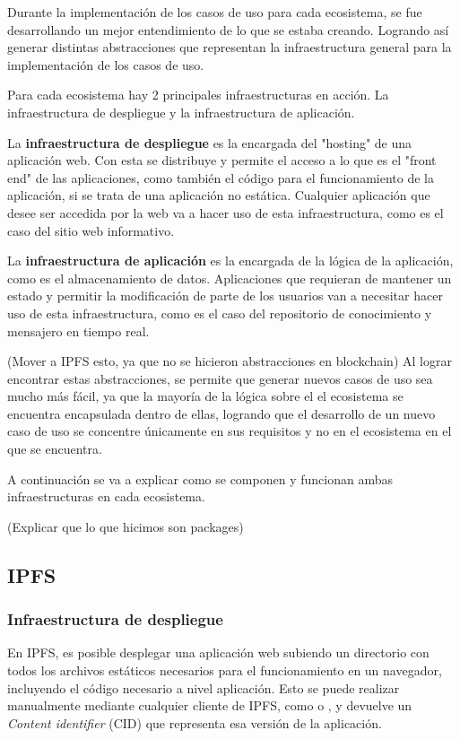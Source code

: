 Durante la implementación de los casos de uso para cada ecosistema, se fue desarrollando un mejor entendimiento de lo que se estaba creando. Logrando así generar distintas abstracciones que representan la infraestructura general para la implementación de los casos de uso.

Para cada ecosistema hay 2 principales infraestructuras en acción. La infraestructura de despliegue y la infraestructura de aplicación.

La \textbf{infraestructura de despliegue} es la encargada del "hosting" de una aplicación web. Con esta se distribuye y permite el acceso a lo que es el "front end" de las aplicaciones, como también el código para el funcionamiento de la aplicación, si se trata de una aplicación no estática. Cualquier aplicación que desee ser accedida por la web va a hacer uso de esta infraestructura, como es el caso del sitio web informativo.

La \textbf{infraestructura de aplicación} es la encargada de la lógica de la aplicación, como es el almacenamiento de datos. Aplicaciones que requieran de mantener un estado y permitir la modificación de parte de los usuarios van a necesitar hacer uso de esta infraestructura, como es el caso del repositorio de conocimiento y mensajero en tiempo real.

(Mover a IPFS esto, ya que no se hicieron abstracciones en blockchain) Al lograr encontrar estas abstracciones, se permite que generar nuevos casos de uso sea mucho más fácil, ya que la mayoría de la lógica sobre el el ecosistema se encuentra encapsulada dentro de ellas, logrando que el desarrollo de un nuevo caso de uso se concentre únicamente en sus requisitos y no en el ecosistema en el que se encuentra.

A continuación se va a explicar como se componen y funcionan ambas infraestructuras en cada ecosistema.

(Explicar que lo que hicimos son packages)

\subsection{IPFS}

\subsubsection{Infraestructura de despliegue}

En IPFS, es posible desplegar una aplicación web subiendo un directorio con todos los archivos estáticos necesarios para el funcionamiento en un navegador, incluyendo el código necesario a nivel aplicación. Esto se puede realizar manualmente mediante cualquier cliente de IPFS, como \cite{kubo} o \cite{helia}, y devuelve un \textit{Content identifier} (CID) \cite{cid} que representa esa versión de la aplicación.

